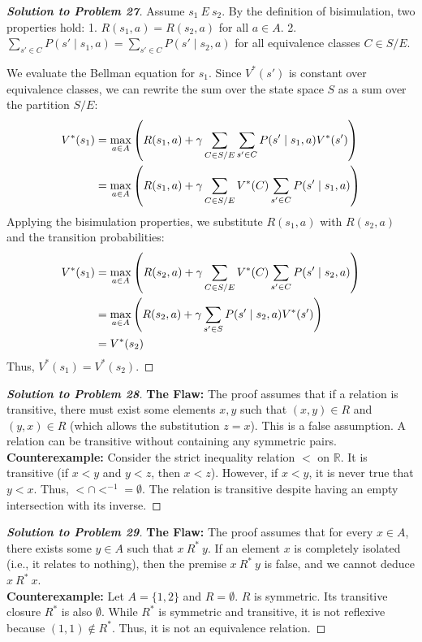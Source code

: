 \documentclass[11pt, a4paper]{article}
\theoremstyle{definition}
\theoremstyle{remark}
\newcommand{\R}{\mathbb{R}}
\begin{document}
\begin{proof}[\textbf{Solution to Problem 27}]
Assume $s_1 \ E \ s_2$. By the definition of bisimulation, two properties hold:
1. $R(s_1, a) = R(s_2, a)$ for all $a \in A$.
2. $\sum_{s' \in C} P(s' \mid s_1, a) = \sum_{s' \in C} P(s' \mid s_2, a)$ for all equivalence classes $C \in S/E$.

We evaluate the Bellman equation for $s_1$. Since $V^*(s')$ is constant over equivalence classes, we can rewrite the sum over the state space $S$ as a sum over the partition $S/E$:
\begin{align*}
V^*(s_1) &= \max_{a \in A} \left( R(s_1,a) + \gamma \sum_{C \in S/E} \sum_{s' \in C} P(s' \mid s_1,a) V^*(s') \right) \\ \relax
&= \max_{a \in A} \left( R(s_1,a) + \gamma \sum_{C \in S/E} V^*(C) \sum_{s' \in C} P(s' \mid s_1,a) \right)
\end{align*}
Applying the bisimulation properties, we substitute $R(s_1, a)$ with $R(s_2, a)$ and the transition probabilities:
\begin{align*}
V^*(s_1) &= \max_{a \in A} \left( R(s_2,a) + \gamma \sum_{C \in S/E} V^*(C) \sum_{s' \in C} P(s' \mid s_2,a) \right) \\ \relax
&= \max_{a \in A} \left( R(s_2,a) + \gamma \sum_{s' \in S} P(s' \mid s_2,a) V^*(s') \right) \\ \relax
&= V^*(s_2)
\end{align*}
Thus, $V^*(s_1) = V^*(s_2)$.
\end{proof}

\begin{proof}[\textbf{Solution to Problem 28}]
\textbf{The Flaw:} The proof assumes that if a relation is transitive, there must exist some elements $x, y$ such that $(x, y) \in R$ and $(y, x) \in R$ (which allows the substitution $z = x$). This is a false assumption. A relation can be transitive without containing any symmetric pairs. \\
\textbf{Counterexample:} Consider the strict inequality relation $<$ on $\R$. It is transitive (if $x < y$ and $y < z$, then $x < z$). However, if $x < y$, it is never true that $y < x$. Thus, $< \cap <^{-1} = \emptyset$. The relation is transitive despite having an empty intersection with its inverse.
\end{proof}

\begin{proof}[\textbf{Solution to Problem 29}]
\textbf{The Flaw:} The proof assumes that for every $x \in A$, there exists some $y \in A$ such that $x \ R^* \ y$. If an element $x$ is completely isolated (i.e., it relates to nothing), then the premise $x \ R^* \ y$ is false, and we cannot deduce $x \ R^* \ x$. \\
\textbf{Counterexample:} Let $A = \{1, 2\}$ and $R = \emptyset$. $R$ is symmetric. Its transitive closure $R^*$ is also $\emptyset$. While $R^*$ is symmetric and transitive, it is not reflexive because $(1, 1) \notin R^*$. Thus, it is not an equivalence relation.
\end{proof}
\end{document}
